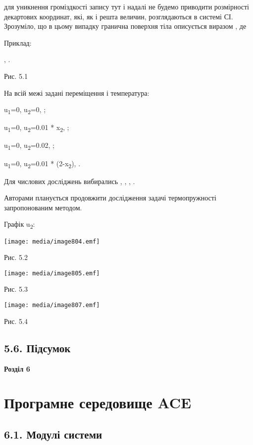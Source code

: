 для уникнення громіздкості запису тут і надалі не будемо приводити
розмірності декартових координат, які, як і решта величин, розглядаються
в системі СІ. Зрозуміло, що в цьому випадку гранична поверхня тіла
описується виразом , де

Приклад:

, .

Рис. 5.1

На всій межі задані переміщення і температура:

u\textsubscript{1}=0, u\textsubscript{2}=0, ;

u\textsubscript{1}=0, u\textsubscript{2}=0.01 * x\textsubscript{2}, ;

u\textsubscript{1}=0, u\textsubscript{2}=0.02, ;

u\textsubscript{1}=0, u\textsubscript{2}=0.01 * (2-x\textsubscript{2}),
.

Для числових досліджень виби­рались , , , .

Авторами планується продовжити дослідження задачі термопружності
запропонованим методом.

Графік u\textsubscript{2}:

\texttt{[image: media/image804.emf]}

Рис. 5.2

\texttt{[image: media/image805.emf]}

Рис. 5.3

\texttt{[image: media/image807.emf]}

Рис. 5.4

\hypertarget{ux43fux456ux434ux441ux443ux43cux43eux43a-3}{%
\subsection{5.6.
Підсумок}\label{ux43fux456ux434ux441ux443ux43cux43eux43a-3}}

\textbf{\hfill\break
Розділ 6}

\hypertarget{ux43fux440ux43eux433ux440ux430ux43cux43dux435-ux441ux435ux440ux435ux434ux43eux432ux438ux449ux435-ace}{%
\section{Програмне середовище
ACE}\label{ux43fux440ux43eux433ux440ux430ux43cux43dux435-ux441ux435ux440ux435ux434ux43eux432ux438ux449ux435-ace}}

\hypertarget{ux43cux43eux434ux443ux43bux456-ux441ux438ux441ux442ux435ux43cux438}{%
\subsection{6.1. Модулі
системи}\label{ux43cux43eux434ux443ux43bux456-ux441ux438ux441ux442ux435ux43cux438}}

